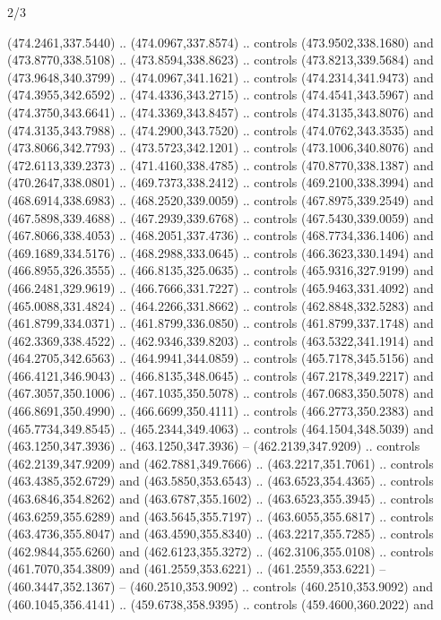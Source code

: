 \begin{flagdescription}{2/3}
\begin{scope}[xshift=0.5\flaglength,yshift=0.5\flagwidth,scale=\flagwidth/495.65]
\begin{scope}[y=0.8pt, x=0.8pt, yscale=-1,shift={(-463.76,-309.78)}]
  (474.2461,337.5440) .. (474.0967,337.8574) .. controls (473.9502,338.1680) and
  (473.8770,338.5108) .. (473.8594,338.8623) .. controls (473.8213,339.5684) and
  (473.9648,340.3799) .. (474.0967,341.1621) .. controls (474.2314,341.9473) and
  (474.3955,342.6592) .. (474.4336,343.2715) .. controls (474.4541,343.5967) and
  (474.3750,343.6641) .. (474.3369,343.8457) .. controls (474.3135,343.8076) and
  (474.3135,343.7988) .. (474.2900,343.7520) .. controls (474.0762,343.3535) and
  (473.8066,342.7793) .. (473.5723,342.1201) .. controls (473.1006,340.8076) and
  (472.6113,339.2373) .. (471.4160,338.4785) .. controls (470.8770,338.1387) and
  (470.2647,338.0801) .. (469.7373,338.2412) .. controls (469.2100,338.3994) and
  (468.6914,338.6983) .. (468.2520,339.0059) .. controls (467.8975,339.2549) and
  (467.5898,339.4688) .. (467.2939,339.6768) .. controls (467.5430,339.0059) and
  (467.8066,338.4053) .. (468.2051,337.4736) .. controls (468.7734,336.1406) and
  (469.1689,334.5176) .. (468.2988,333.0645) .. controls (466.3623,330.1494) and
  (466.8955,326.3555) .. (466.8135,325.0635) .. controls (465.9316,327.9199) and
  (466.2481,329.9619) .. (466.7666,331.7227) .. controls (465.9463,331.4092) and
  (465.0088,331.4824) .. (464.2266,331.8662) .. controls (462.8848,332.5283) and
  (461.8799,334.0371) .. (461.8799,336.0850) .. controls (461.8799,337.1748) and
  (462.3369,338.4522) .. (462.9346,339.8203) .. controls (463.5322,341.1914) and
  (464.2705,342.6563) .. (464.9941,344.0859) .. controls (465.7178,345.5156) and
  (466.4121,346.9043) .. (466.8135,348.0645) .. controls (467.2178,349.2217) and
  (467.3057,350.1006) .. (467.1035,350.5078) .. controls (467.0683,350.5078) and
  (466.8691,350.4990) .. (466.6699,350.4111) .. controls (466.2773,350.2383) and
  (465.7734,349.8545) .. (465.2344,349.4063) .. controls (464.1504,348.5039) and
  (463.1250,347.3936) .. (463.1250,347.3936) -- (462.2139,347.9209) .. controls
  (462.2139,347.9209) and (462.7881,349.7666) .. (463.2217,351.7061) .. controls
  (463.4385,352.6729) and (463.5850,353.6543) .. (463.6523,354.4365) .. controls
  (463.6846,354.8262) and (463.6787,355.1602) .. (463.6523,355.3945) .. controls
  (463.6259,355.6289) and (463.5645,355.7197) .. (463.6055,355.6817) .. controls
  (463.4736,355.8047) and (463.4590,355.8340) .. (463.2217,355.7285) .. controls
  (462.9844,355.6260) and (462.6123,355.3272) .. (462.3106,355.0108) .. controls
  (461.7070,354.3809) and (461.2559,353.6221) .. (461.2559,353.6221) --
  (460.3447,352.1367) -- (460.2510,353.9092) .. controls (460.2510,353.9092) and
  (460.1045,356.4141) .. (459.6738,358.9395) .. controls (459.4600,360.2022) and

\end{scope}
\end{scope}
\end{flagdescription}
